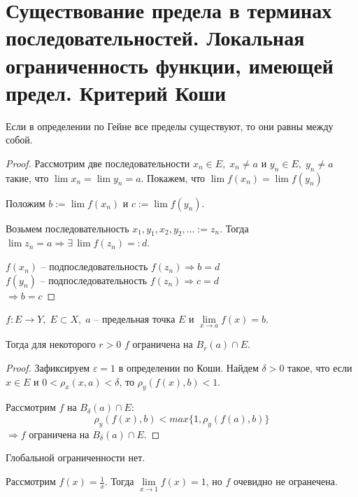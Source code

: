 \section{Существование предела в терминах последовательностей. Локальная ограниченность функции, имеющей предел. Критерий Коши}

\begin{theorem-non}
    Если в определении по Гейне все пределы существуют, то они равны между собой. 
\end{theorem-non}
\begin{proof}
    Рассмотрим две последовательности $x_n \in E, \; x_n \neq a$ и $y_n \in E, \; y_n \neq a$ такие, что $\lim x_n = \lim y_n = a$. Покажем, что $\lim f(x_n) = \lim f(y_n)$
    
    Положим $b := \lim f(x_n)$ и $c := \lim f(y_n)$.

    Возьмем последовательность $x_1, y_1, x_2, y_2, \dots := z_n$. Тогда $\lim z_n = a \Rightarrow \exists \, \lim f(z_n) =: d$.
    
    $f(x_n)$ -- подпоследовательность $f(z_n) \Rightarrow b = d$ \\
    $f(y_n)$ -- подпоследовательность $f(z_n) \Rightarrow c = d$ \\
    $\Rightarrow b = c$
\end{proof}

\begin{theorem-non}
    $f : E \to Y, \; E \subset X, \; a$ -- предельная точка $E$ и $\lim\limits_{x \to a} f(x) = b$. 

    Тогда для некоторого $r > 0$ $f$ ограничена на $B_r(a) \cap E$. 
\end{theorem-non}
\begin{proof}
    Зафиксируем $\varepsilon = 1$ в определении по Коши. Найдем $\delta > 0$ такое, что если $x \in E$ и $0 < \rho_x(x, a) < \delta$, то $\rho_y(f(x), b) < 1$.

    Рассмотрим $f$ на $B_{\delta}(a) \cap E$:
    \[ \rho_y(f(x), b) < max \{1, \rho_y(f(a), b)\} \]
    $\Rightarrow f$ ограничена на $B_{\delta}(a) \cap E$.
\end{proof}
\begin{notice}
    Глобальной ограниченности нет. 

    Рассмотрим $f(x) = \frac{1}{x}$. Тогда $\lim\limits_{x \to 1} f(x) = 1$, но $f$ очевидно не огранечена.
\end{notice}

\vspace{7mm}

